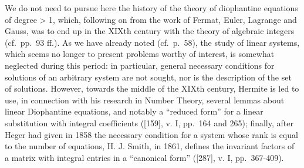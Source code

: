 We do not need to pursue here the history of the theory of diophantine equations of degree \textgreater{} 1, which, following on from the work of Fermat, Euler, Lagrange and Gauss, was to end up in the XIXth century with the theory of algebraic integers (cf.~pp.~93 ff.). As we have already noted (cf.~p.~58), the study of linear systems, which seems no longer to present problems worthy of interest, is somewhat neglected during this period: in particular, general necessary conditions for solutions of an arbitrary system are not sought, nor is the description of the set of solutions. However, towards the middle of the XIXth century, Hermite is led to use, in connection with his research in Number Theory, several lemmas about linear Diophantine equations, and notably a ``reduced form'' for a linear substitution with integral coefficients ({[}159{]}, v. I, pp.~164 and 265); finally, after Heger had given in 1858 the necessary condition for a system whose rank is equal to the number of equations, H. J. Smith, in 1861, defines the invariant factors of a matrix with integral entries in a ``canonical form'' ({[}287{]}, v. I, pp.~367-409).


